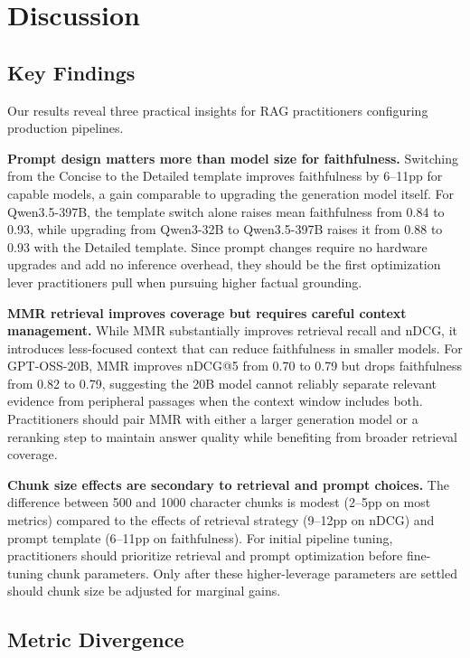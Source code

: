 \section{Discussion}
\label{sec:discussion}

\subsection{Key Findings}

Our results reveal three practical insights for RAG practitioners configuring production pipelines.

\textbf{Prompt design matters more than model size for faithfulness.} Switching from the Concise to the Detailed template improves faithfulness by 6--11pp for capable models, a gain comparable to upgrading the generation model itself. For Qwen3.5-397B, the template switch alone raises mean faithfulness from 0.84 to 0.93, while upgrading from Qwen3-32B to Qwen3.5-397B raises it from 0.88 to 0.93 with the Detailed template. Since prompt changes require no hardware upgrades and add no inference overhead, they should be the first optimization lever practitioners pull when pursuing higher factual grounding.

\textbf{MMR retrieval improves coverage but requires careful context management.} While MMR substantially improves retrieval recall and nDCG, it introduces less-focused context that can reduce faithfulness in smaller models. For GPT-OSS-20B, MMR improves nDCG@5 from 0.70 to 0.79 but drops faithfulness from 0.82 to 0.79, suggesting the 20B model cannot reliably separate relevant evidence from peripheral passages when the context window includes both. Practitioners should pair MMR with either a larger generation model or a reranking step to maintain answer quality while benefiting from broader retrieval coverage.

\textbf{Chunk size effects are secondary to retrieval and prompt choices.} The difference between 500 and 1000 character chunks is modest (2--5pp on most metrics) compared to the effects of retrieval strategy (9--12pp on nDCG) and prompt template (6--11pp on faithfulness). For initial pipeline tuning, practitioners should prioritize retrieval and prompt optimization before fine-tuning chunk parameters. Only after these higher-leverage parameters are settled should chunk size be adjusted for marginal gains.

\subsection{Metric Divergence}


